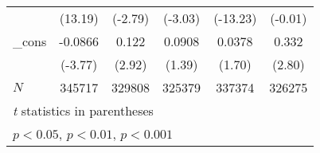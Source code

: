 \begin{table}[htbp]
\begin{tabular}{l*{5}{c}}
            &     (13.19)         &     (-2.79)         &     (-3.03)         &    (-13.23)         &     (-0.01)         \\
\_cons      &     -0.0866\sym{***}&       0.122\sym{**} &      0.0908         &      0.0378         &       0.332\sym{**} \\
            &     (-3.77)         &      (2.92)         &      (1.39)         &      (1.70)         &      (2.80)         \\
\hline
\(N\)       &      345717         &      329808         &      325379         &      337374         &      326275         \\
\hline\hline
\multicolumn{6}{l}{\footnotesize \textit{t} statistics in parentheses}\\
\multicolumn{6}{l}{\footnotesize \sym{*} \(p<0.05\), \sym{**} \(p<0.01\), \sym{***} \(p<0.001\)}\\
\end{tabular}
\end{table}
